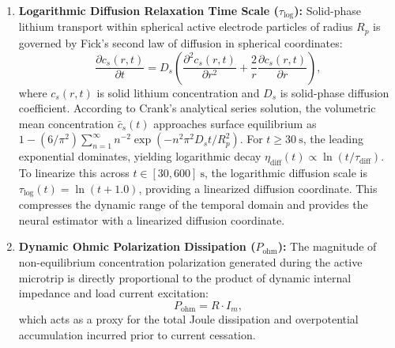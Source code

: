 \begin{enumerate}
	\item \textbf{Logarithmic Diffusion Relaxation Time Scale ($\tau_{\text{log}}$):}
	Solid-phase lithium transport within spherical active electrode particles of radius $R_p$ is governed by Fick's second law of diffusion in spherical coordinates:
	\begin{equation}
		\label{eq:fick_diffusion}
		\frac{\partial c_s(r, t)}{\partial t} = D_s \left( \frac{\partial^2 c_s(r, t)}{\partial r^2} + \frac{2}{r} \frac{\partial c_s(r, t)}{\partial r} \right),
	\end{equation}
	where $c_s(r, t)$ is solid lithium concentration and $D_s$ is solid-phase diffusion coefficient. According to Crank's analytical series solution, the volumetric mean concentration $\bar{c}_s(t)$ approaches surface equilibrium as $1 - (6/\pi^2)\sum_{n=1}^{\infty} n^{-2} \exp(-n^2 \pi^2 D_s t / R_p^2)$. For $t \ge 30\ \text{s}$, the leading exponential dominates, yielding logarithmic decay $\eta_{\text{diff}}(t) \propto \ln(t / \tau_{\text{diff}})$. To linearize this across $t \in [30, 600]\ \text{s}$, the logarithmic diffusion scale is $\tau_{\text{log}}(t) = \ln(t + 1.0)$, providing a linearized diffusion coordinate. This compresses the dynamic range of the temporal domain and provides the neural estimator with a linearized diffusion coordinate.
	
	\item \textbf{Dynamic Ohmic Polarization Dissipation ($P_{\text{ohm}}$):}
	The magnitude of non-equilibrium concentration polarization generated during the active microtrip is directly proportional to the product of dynamic internal impedance and load current excitation:
	\begin{equation}
		\label{eq:p_ohm}
		P_{\text{ohm}} = R \cdot I_m,
	\end{equation}
	which acts as a proxy for the total Joule dissipation and overpotential accumulation incurred prior to current cessation.
	

\end{enumerate}
